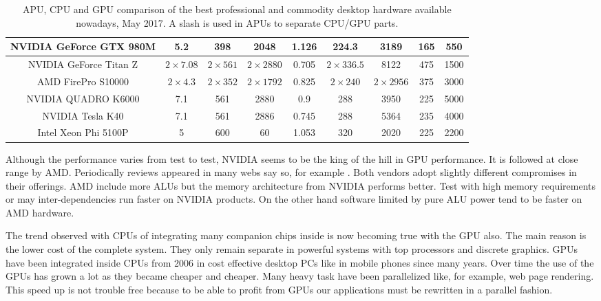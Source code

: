 \documentclass{article}
\begin{document}
\begin{table}[!ht]
{\begin{tabular}{|c|c|c|c|c|c|c|c|c|}
\hline
NVIDIA GeForce GTX 980M & 5.2           & 398          & 2048          & 1.126      & 224.3        & 3189           & 165 & 550    \\
\hline
NVIDIA GeForce Titan Z  & $2\times7.08$ & $2\times561$ & $2\times2880$ & 0.705      & $2\times336.5$ & 8122         & 475 & 1500   \\
\hline
\hline
AMD FirePro S10000      & $2\times4.3$  & $2\times352$ & $2\times1792$ & 0.825      & $2\times240$ & $2\times2956$  & 375 & 3000   \\
\hline
NVIDIA QUADRO K6000     & 7.1           & 561          & 2880          & 0.9        & 288          & 3950           & 225 & 5000   \\
\hline
\hline
NVIDIA Tesla K40        & 7.1           & 561          & 2886          & 0.745      & 288          & 5364           & 235 & 4000   \\
\hline
Intel Xeon Phi 5100P    & 5             & 600          & 60            & 1.053      & 320          & 2020           & 225 & 2200   \\
\hline

\end{tabular}
}
\caption{APU, CPU and GPU comparison of the best professional and commodity desktop hardware available nowadays, May 2017. A slash is used in APUs to separate CPU/GPU parts. \label{tab:features}}
\end{table}

Although the performance varies from test to test, NVIDIA seems to be the king of the hill in GPU performance. It is followed at close range by AMD. Periodically reviews appeared in many webs say so, for example \cite{benchmarkGPU2016}. Both vendors adopt slightly different compromises in their offerings. AMD include more ALUs but the memory architecture from NVIDIA performs better. Test with high memory requirements or may inter-dependencies run faster on NVIDIA products. On the other hand software limited by pure ALU power tend to be faster on AMD hardware.

The trend observed with CPUs of integrating many companion chips inside is now becoming true with the GPU also. The main reason is the lower cost of the complete system. They only remain separate in powerful systems with top processors and discrete graphics. GPUs have been integrated inside CPUs from 2006 in cost effective desktop PCs like in mobile phones since many years. Over time the use of the GPUs has grown a lot as they became cheaper and cheaper. Many heavy task have been parallelized like, for example, web page rendering. This speed up is not trouble free because to be able to profit from GPUs our applications must be rewritten in a parallel fashion.
\end{document}
